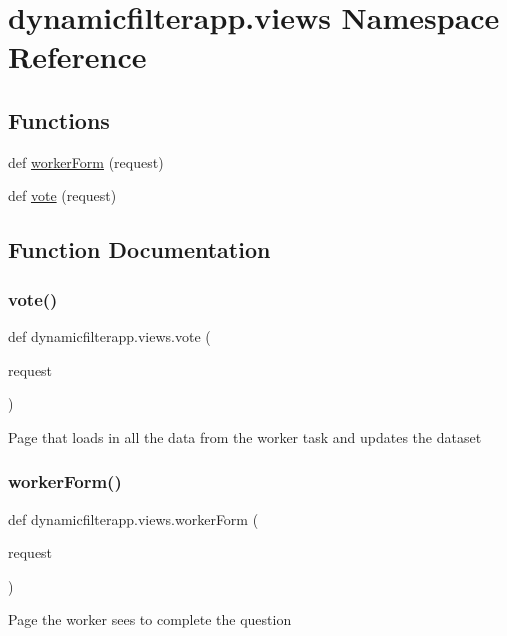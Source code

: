 \hypertarget{namespacedynamicfilterapp_1_1views}{}\section{dynamicfilterapp.\+views Namespace Reference}
\label{namespacedynamicfilterapp_1_1views}
\subsection*{Functions}
\begin{DoxyCompactItemize}
\item 
def \mbox{\hyperlink{namespacedynamicfilterapp_1_1views_a41bd6e65140c4010e5aa8332ac5737ca}{worker\+Form}} (request)
\item 
def \mbox{\hyperlink{namespacedynamicfilterapp_1_1views_a0b8356871afd7c5f24877793011b773c}{vote}} (request)
\end{DoxyCompactItemize}


\subsection{Function Documentation}
\mbox{\label{namespacedynamicfilterapp_1_1views_a0b8356871afd7c5f24877793011b773c}} 
\subsubsection{\texorpdfstring{vote()}{vote()}}
{\footnotesize\ttfamily def dynamicfilterapp.\+views.\+vote (\begin{DoxyParamCaption}\item[{}]{request }\end{DoxyParamCaption})}

\begin{DoxyVerb}Page that loads in all the data from the worker task and updates the dataset
\end{DoxyVerb}
 \mbox{\label{namespacedynamicfilterapp_1_1views_a41bd6e65140c4010e5aa8332ac5737ca}} 
\subsubsection{\texorpdfstring{workerForm()}{workerForm()}}
{\footnotesize\ttfamily def dynamicfilterapp.\+views.\+worker\+Form (\begin{DoxyParamCaption}\item[{}]{request }\end{DoxyParamCaption})}

\begin{DoxyVerb}Page the worker sees to complete the question
\end{DoxyVerb}
 